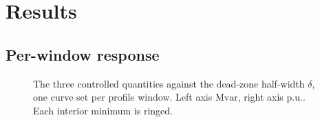 \documentclass[11pt,a4paper]{article}
\newcommand{\pu}{\ensuremath{\mathrm{p.u.}}}
\newcommand{\Mvar}{\ensuremath{\mathrm{Mvar}}}
\newcommand{\dz}{\ensuremath{\delta}}
\begin{document}
\section{Results}


\subsection{Per-window response}

\begin{figure}[htbp]
\centering
\caption{The three controlled quantities against the dead-zone half-width
$\dz$, one curve set per profile window. Left axis \si{\Mvar}, right axis
\pu. Each interior minimum is ringed.}
\label{fig:selection}
\end{figure}
\end{document}
